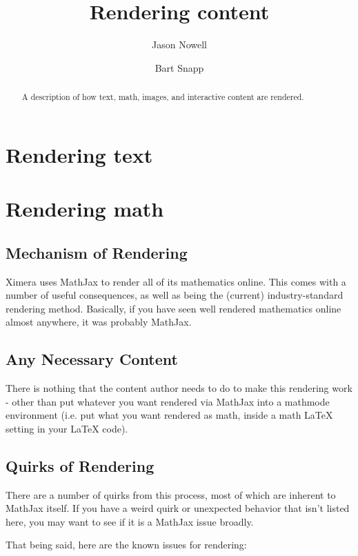 \documentclass{ximera}
\title{Rendering content}
\author{Jason Nowell \and Bart Snapp}
\begin{document}
\begin{abstract}
    A description of how text, math, images, and interactive content are rendered.
\end{abstract}
\maketitle
    
\section{Rendering text}



\section{Rendering math}
    \subsection*{Mechanism of Rendering}
        Ximera uses MathJax to render all of its mathematics online. This comes with a number of useful consequences, as well as being the (current) industry-standard rendering method. Basically, if you have seen well rendered mathematics online almost anywhere, it was probably MathJax.
     
     
    \subsection{Any Necessary Content}
        There is nothing that the content author needs to do to make this rendering work - other than put whatever you want rendered via MathJax into a mathmode environment (i.e. put what you want rendered as math, inside a math LaTeX setting in your LaTeX code).
     
     
    \subsection{Quirks of Rendering}
        There are a number of quirks from this process, most of which are inherent to MathJax itself. If you have a weird quirk or unexpected behavior that isn't listed here, you may want to see if it is a MathJax issue broadly.
         
        That being said, here are the known issues for rendering:
         
\end{document}
